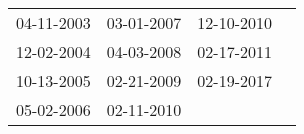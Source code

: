 \begin{supertabular}{llll}
 04-11-2003 &  03-01-2007 &  12-10-2010 \\
 12-02-2004 &  04-03-2008 &  02-17-2011 \\
 10-13-2005 &  02-21-2009 &  02-19-2017 \\
 05-02-2006 &  02-11-2010 &             \\
\end{supertabular}
